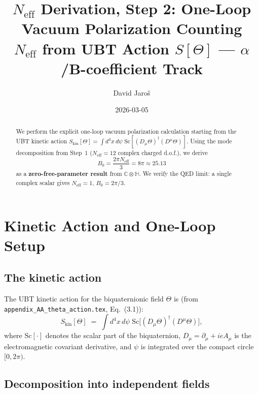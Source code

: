 \documentclass[12pt,a4paper]{article}
\title{%
  $N_\mathrm{eff}$ Derivation, Step 2: One-Loop Vacuum Polarization Counting\\
  \large $N_{\mathrm{eff}}$ from UBT Action $S[\Theta]$ --- $\alpha$/B-coefficient Track}
\author{David Jaroš}
\date{2026-03-05}
\theoremstyle{definition}
\theoremstyle{remark}
\newcommand{\C}{\mathbb{C}}
\renewcommand{\H}{\mathbb{H}}
\newcommand{\Neff}{N_{\mathrm{eff}}}
\newcommand{\Sc}{\mathrm{Sc}}
\begin{document}
\maketitle

\begin{abstract}
We perform the explicit one-loop vacuum polarization calculation starting from
the UBT kinetic action
$S_\mathrm{kin}[\Theta] = \int d^4x\,d\psi\;\Sc[(D_\mu\Theta)^\dagger(D^\mu\Theta)]$.
Using the mode decomposition from Step~1 ($\Neff = 12$ complex charged d.o.f.),
we derive
\begin{equation*}
  B_0 = \frac{2\pi \Neff}{3} = 8\pi \approx 25.13
\end{equation*}
as a \textbf{zero-free-parameter result} from $\C \otimes \H$.
We verify the QED limit: a single complex scalar gives $\Neff = 1$, $B_0 = 2\pi/3$.
\end{abstract}

\tableofcontents

\section{Kinetic Action and One-Loop Setup}
\label{sec:setup}

\subsection{The kinetic action}

The UBT kinetic action for the biquaternionic field $\Theta$ is
(from \texttt{appendix\_AA\_theta\_action.tex}, Eq.~(3.1)):
\begin{equation}
  S_\mathrm{kin}[\Theta]
  \;=\; \int d^4x\,d\psi\;
  \Sc\!\bigl[(D_\mu\Theta)^\dagger(D^\mu\Theta)\bigr],
  \label{eq:S_kin}
\end{equation}
where $\Sc[\cdot]$ denotes the scalar part of the biquaternion,
$D_\mu = \partial_\mu + ieA_\mu$ is the electromagnetic covariant derivative,
and $\psi$ is integrated over the compact circle $[0,2\pi)$.

\subsection{Decomposition into independent fields}
\end{document}

